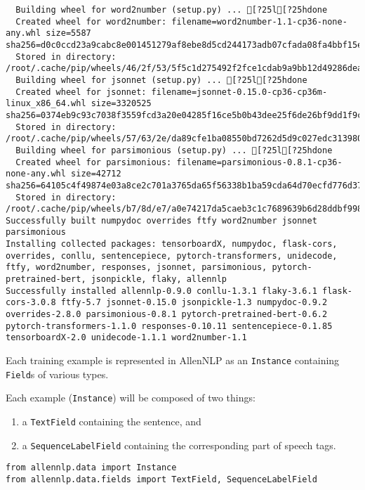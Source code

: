 \documentclass[
]{article}
\providecommand{\tightlist}{%
  \setlength{\itemsep}{0pt}\setlength{\parskip}{0pt}}
\begin{document}
\begin{verbatim}
  Building wheel for word2number (setup.py) ... [?25l[?25hdone
  Created wheel for word2number: filename=word2number-1.1-cp36-none-any.whl size=5587 sha256=d0c0ccd23a9cabc8e001451279af8ebe8d5cd244173adb07cfada08fa4bbf15e
  Stored in directory: /root/.cache/pip/wheels/46/2f/53/5f5c1d275492f2fce1cdab9a9bb12d49286dead829a4078e0e
  Building wheel for jsonnet (setup.py) ... [?25l[?25hdone
  Created wheel for jsonnet: filename=jsonnet-0.15.0-cp36-cp36m-linux_x86_64.whl size=3320525 sha256=0374eb9c93c7038f3559fcd3a20e04285f16ce5b0b43dee25f6de26bf9dd1f9c
  Stored in directory: /root/.cache/pip/wheels/57/63/2e/da89cfe1ba08550bd7262d5d9c027edc313980c3b85b3b0a38
  Building wheel for parsimonious (setup.py) ... [?25l[?25hdone
  Created wheel for parsimonious: filename=parsimonious-0.8.1-cp36-none-any.whl size=42712 sha256=64105c4f49874e03a8ce2c701a3765da65f56338b1ba59cda64d70ecfd776d37
  Stored in directory: /root/.cache/pip/wheels/b7/8d/e7/a0e74217da5caeb3c1c7689639b6d28ddbf9985b840bc96a9a
Successfully built numpydoc overrides ftfy word2number jsonnet parsimonious
Installing collected packages: tensorboardX, numpydoc, flask-cors, overrides, conllu, sentencepiece, pytorch-transformers, unidecode, ftfy, word2number, responses, jsonnet, parsimonious, pytorch-pretrained-bert, jsonpickle, flaky, allennlp
Successfully installed allennlp-0.9.0 conllu-1.3.1 flaky-3.6.1 flask-cors-3.0.8 ftfy-5.7 jsonnet-0.15.0 jsonpickle-1.3 numpydoc-0.9.2 overrides-2.8.0 parsimonious-0.8.1 pytorch-pretrained-bert-0.6.2 pytorch-transformers-1.1.0 responses-0.10.11 sentencepiece-0.1.85 tensorboardX-2.0 unidecode-1.1.1 word2number-1.1
\end{verbatim}

Each training example is represented in AllenNLP as an \texttt{Instance}
containing \texttt{Field}s of various types.

Each example (\texttt{Instance}) will be composed of two things:

\begin{enumerate}
\def\labelenumi{\arabic{enumi}.}
\tightlist
\item
  a \texttt{TextField} containing the sentence, and
\item
  a \texttt{SequenceLabelField} containing the corresponding part of
  speech tags.
\end{enumerate}

\begin{verbatim}
from allennlp.data import Instance
from allennlp.data.fields import TextField, SequenceLabelField
\end{verbatim}
\end{document}
